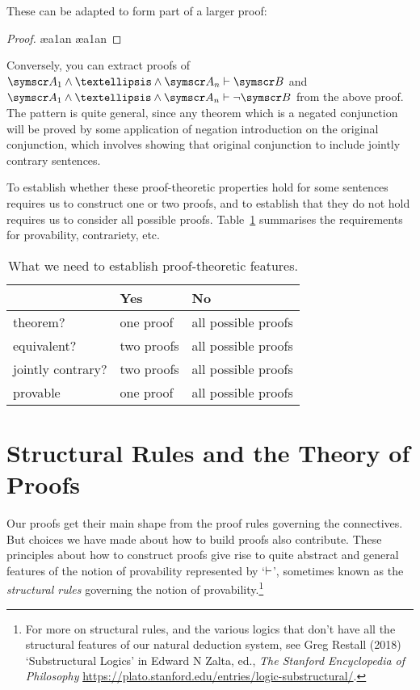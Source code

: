 These can be adapted to form part of a larger proof:
\begin{proof}
	\open
		\ae{a1an}
		\have[\ ]{}{\vdots}
		\ae{a1an}
		\have[\ ]{}{\vdots}
		\have[\ ]{}{\vdots}
		\close
	\end{proof}
Conversely, you can extract proofs of $\meta{A}_{1}\wedge … \wedge \meta{A}_{n}\proves \meta{B}$ and $\meta{A}_{1}\wedge … \wedge \meta{A}_{n}\proves \enot\meta{B}$ from the above proof. The pattern is quite general, since any theorem which is a negated conjunction will be proved by some application of negation introduction on the original conjunction, which involves showing that original conjunction to include jointly contrary sentences.

To establish whether these proof-theoretic properties hold for some sentences requires us to construct one or two proofs, and to establish that they do not hold requires us to consider all possible proofs. Table~\ref{proofstable} summarises the requirements for provability, contrariety, etc.
\begin{table}[b]
\begin{tabular}{l l l} \toprule 
 & \textbf{Yes} & \textbf{No}\\
 \midrule
theorem? & one proof & all possible proofs\\
equivalent? & two proofs & all possible proofs\\
jointly contrary? & two proofs & all possible proofs\\
provable & one proof & all possible proofs\\
\bottomrule \end{tabular}
\caption{What we need to establish proof-theoretic features.\label{proofstable}}
\end{table}


\section{Structural Rules and the Theory of Proofs}\label{s:substructural}

Our proofs get their main shape from the proof rules governing the connectives. But choices we have made about how to build proofs also contribute. These principles about how to construct proofs give rise to quite abstract and general features of the notion of provability represented by `$\vdash$', sometimes known as the \emph{structural rules} governing the notion of provability.\footnote{For more on structural rules, and the various logics that don't have all the structural features of our natural deduction system, see Greg Restall (2018) `Substructural Logics' in Edward N Zalta, ed., \emph{The Stanford Encyclopedia of Philosophy} \url{https://plato.stanford.edu/entries/logic-substructural/}.}

